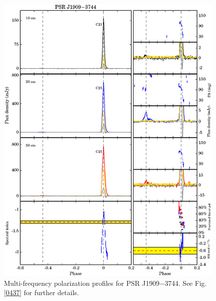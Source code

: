 \documentclass[useAMS,usenatbib]{mn2e}
\begin{document}
\begin{appendix}
\begin{figure}
\begin{center}
\includegraphics[width=6 in]{1909.ps}
\caption{Multi-frequency polarization profiles for PSR J1909$-$3744. 
See Fig. \ref{0437} for further details.}
\label{1909}
\end{center}
\end{figure}


\end{appendix}
\end{document}
